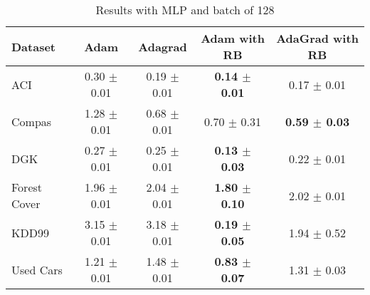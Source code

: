\begin{table}[hb!]%
  \caption{Results with MLP and batch of 128}
  \label{tab:resultsMLP128}
  \begin{footnotesize}
  \begin{center}
  \begin{tabular}{l|cccc}
    \toprule
    Dataset      & Adam          & Adagrad      & Adam with RB          & AdaGrad with RB       \\
    \midrule                                                                                       
    ACI          & 0.30 $\pm$ 0.01  & 0.19 $\pm$ 0.01 & \textbf{0.14 $\pm$ 0.01} & 0.17 $\pm$ 0.01          \\
    Compas       & 1.28 $\pm$ 0.01  & 0.68 $\pm$ 0.01 & 0.70 $\pm$ 0.31          & \textbf{0.59 $\pm$ 0.03} \\
    DGK          & 0.27 $\pm$ 0.01  & 0.25 $\pm$ 0.01 & \textbf{0.13 $\pm$ 0.03} & 0.22 $\pm$ 0.01          \\
    Forest Cover & 1.96 $\pm$ 0.01  & 2.04 $\pm$ 0.01 & \textbf{1.80 $\pm$ 0.10} & 2.02 $\pm$ 0.01          \\
    KDD99        & 3.15 $\pm$ 0.01  & 3.18 $\pm$ 0.01 & \textbf{0.19 $\pm$ 0.05} & 1.94 $\pm$ 0.52          \\
    Used Cars    & 1.21 $\pm$ 0.01  & 1.48 $\pm$ 0.01 & \textbf{0.83 $\pm$ 0.07} & 1.31 $\pm$ 0.03          \\
  \bottomrule
\end{tabular}
\end{center}
\end{footnotesize}
\end{table}




